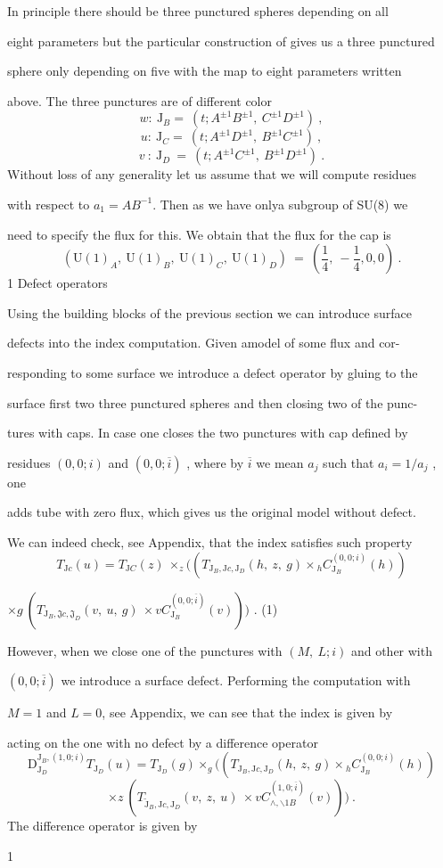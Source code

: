 \documentclass[a4paper,12pt]{article}
\begin{document}
In principle there should be three punctured spheres depending on all

eight parameters but the particular construction of gives us a three punctured

sphere only depending on five with the map to eight parameters written

above. The three punctures are of different color
$$
w:\ \mathrm{J}_{B}=\ (t;A^{\pm 1}B^{\pm 1},\ C^{\pm 1}D^{\pm 1})\ ,
$$
$$
u:\ \mathrm{J}_{C}=\ (t;A^{\pm 1}D^{\pm 1},\ B^{\pm 1}C^{\pm 1})\ ,
$$
$$
v\ :\ \mathrm{J}_{D}\ =\ (t;A^{\pm 1}C^{\pm 1},\ B^{\pm 1}D^{\pm 1})\ .
$$
Without loss of any generality let us assume that we will compute residues

with respect to $a_{1} =AB^{-1}$. Then as we have onlya subgroup of SU(8) we

need to specify the flux for this. We obtain that the flux for the cap is
$$
(\mathrm{U}(1)_{A},\ \mathrm{U}(1)_{B},\ \mathrm{U}(1)_{C},\ \mathrm{U}(1)_{D})\ =\ (\frac{1}{4},\ -\frac{1}{4},0,0)\ .
$$
1 Defect operators

Using the building blocks of the previous section we can introduce surface

defects into the index computation. Given amodel of some flux and cor-

responding to some surface we introduce a defect operator by gluing to the

surface first two three punctured spheres and then closing two of the punc-

tures with caps. In case one closes the two punctures with cap defined by

residues $(0,0;i)$ and $(0,0;\overline{i})$ , where by $\overline{i}$ we mean $a_{j}$ such that $a_{i}=1/a_{j}$ , one

adds tube with zero flux, which gives us the original model without defect.

We can indeed check, see Appendix, that the index satisfies such property
$$
T_{\mathrm{J}c}(u)=T_{\mathrm{J}C}(z)\ \times_{z}((T_{\mathrm{J}_{B},\mathrm{J}c,\mathrm{J}_{D}}(h,\ z,\ g)\times {}_{h}C_{\mathrm{J}_{B}}^{(0,0;i)}(h))
$$
\begin{center}
$\times g\ (T_{\mathrm{J}_{B},\mathfrak{J}c,\mathfrak{J}_{D}}(v,\ u,\ g)\ \times vC_{\mathrm{J}_{B}}^{(0,0;\overline{i})}(v)))$ .   (1)
\end{center}
However, when we close one of the punctures with $(M,\ L;i)$ and other with

$(0,0;\overline{i})$ we introduce a surface defect. Performing the computation with

$M = 1$ and $L = 0$, see Appendix, we can see that the index is given by

acting on the one with no defect by a difference operator
$$
\mathrm{D}_{\mathrm{J}_{D}}^{\mathrm{J}_{B},(1,0;i)}T_{\mathrm{J}_{D}}(u)=T_{\mathrm{J}_{D}}(g)\times_{g}((T_{\mathrm{J}_{B},\mathrm{J}c,\mathrm{J}_{D}}(h,\ z,\ g)\times {}_{h}C_{\mathrm{J}_{B}}^{(0,0;i)}(h))
$$
$$
\times z\ (T_{\tilde{\mathrm{J}}_{B},\mathrm{J}c,\mathrm{J}_{D}}(v,\ z,\ u)\ \times vC_{\wedge,\backslash 1B}^{(1,0;\overline{i})}(v)))\ .
$$
The difference operator is given by

1
\end{document}

